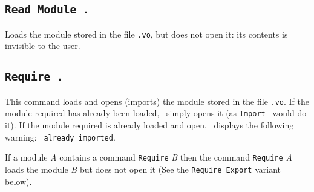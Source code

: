 




\subsection{\tt Read Module {\ident}.}
Loads the module stored in the file {\ident}{\tt .vo}, but does not open it:
its contents is invisible to the user.

\subsection{\tt Require {\ident}.}
\label{Require}
This command loads and opens (imports) the module stored in the file
{\ident}{\tt .vo}.
If the module required has already been loaded, \Coq\ 
simply opens it (as {\tt Import {\ident}} would do it).
If the module required is already loaded and open, \Coq\ 
displays the following warning: {\tt {\ident} already imported}.

If a module {\it A} contains a command {\tt Require} {\it B} then the
command {\tt Require} {\it A} loads the module {\it B} but does not
open it (See the {\tt Require Export} variant below).

